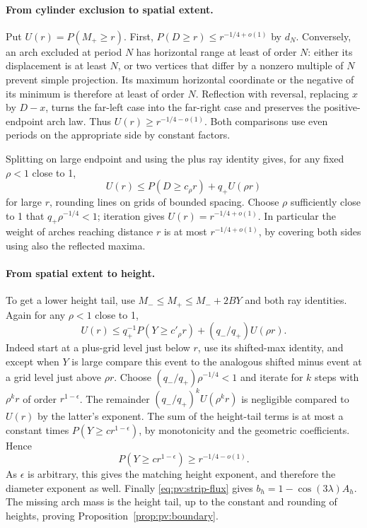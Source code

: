 \paragraph{From cylinder exclusion to spatial extent.}
Put \(U(r)=P(M_+\ge r)\). First, \(P(D\ge r)\le r^{-1/4+o(1)}\) by \(d_N\). Conversely, an arch excluded at period \(N\) has horizontal range at least of order \(N\): either its displacement is at least \(N\), or two vertices that differ by a nonzero multiple of \(N\) prevent simple projection. Its maximum horizontal coordinate or the negative of its minimum is therefore at least of order \(N\). Reflection with reversal, replacing \(x\) by \(D-x\), turns the far-left case into the far-right case and preserves the positive-endpoint arch law. Thus \(U(r)\ge r^{-1/4-o(1)}\). Both comparisons use even periods on the appropriate side by constant factors.

Splitting on large endpoint and using the plus ray identity gives, for any fixed \(\rho<1\) close to 1,
\[
 U(r)\le P(D\ge c_\rho r)+q_+ U(\rho r)
\]
for large \(r\), rounding lines on grids of bounded spacing. Choose \(\rho\) sufficiently close to 1 that \(q_+\rho^{-1/4}<1\); iteration gives \(U(r)=r^{-1/4+o(1)}\). In particular the weight of arches reaching distance \(r\) is at most \(r^{-1/4+o(1)}\), by covering both sides using also the reflected maxima.

\paragraph{From spatial extent to height.}
To get a lower height tail, use \(M_-\le M_+\le M_-+2BY\) and both ray identities. Again for any \(\rho<1\) close to 1,
\[
 U(r)\le q_+^{-1} P(Y\ge c'_\rho r)+(q_-/q_+) U(\rho r).
\]
Indeed start at a plus-grid level just below \(r\), use its shifted-max identity, and except when \(Y\) is large compare this event to the analogous shifted minus event at a grid level just above \(\rho r\). Choose \((q_-/q_+)\rho^{-1/4}<1\) and iterate for \(k\) steps with \(\rho^k r\) of order \(r^{1-\epsilon}\). The remainder \((q_-/q_+)^kU(\rho^k r)\) is negligible compared to \(U(r)\) by the latter's exponent. The sum of the height-tail terms is at most a constant times \(P(Y\ge c r^{1-\epsilon})\), by monotonicity and the geometric coefficients. Hence
\[
 P(Y\ge c r^{1-\epsilon})\ge r^{-1/4-o(1)}.
\]
As \(\epsilon\) is arbitrary, this gives the matching height exponent, and therefore the diameter exponent as well. Finally \eqref{eq:pv:strip-flux} gives \(b_h=1-\cos(3\lambda)A_h\). The missing arch mass is the height tail, up to the constant and rounding of heights, proving Proposition~\ref{prop:pv:boundary}.
